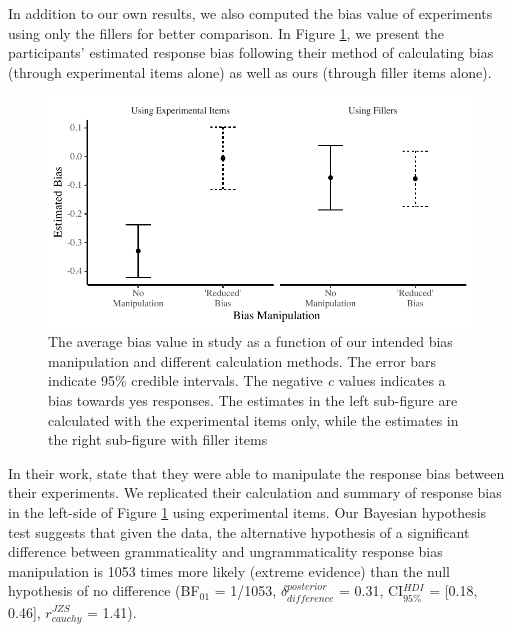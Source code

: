 In addition to our own results, we also computed the bias value of \cites{HammerlyEtAl2019} experiments using only the fillers for better comparison. In Figure \ref{fig:HammerlyBias}, we present the participants' estimated response bias following their method of calculating bias (through experimental items alone) as well as ours (through filler items alone). 


\begin{knitrout}
\color{fgcolor}\begin{figure}[hbt!]

{\centering \includegraphics[width=\linewidth]{figure/HammerlyBias-1} 

}

\caption{The average bias value in \cites{HammerlyEtAl2019} study as a function of our intended bias manipulation and different calculation methods. The error bars indicate 95\% credible intervals. The negative \emph{c} values indicates a bias towards yes responses. The estimates in the left sub-figure are calculated with the experimental items only, while the estimates in the right sub-figure with filler items}\label{fig:HammerlyBias}
\end{figure}

\end{knitrout}

In their work,  state that they were able to manipulate the response bias between their experiments. 
We replicated their calculation and summary of response bias in the left-side of Figure \ref{fig:HammerlyBias} using experimental items. 
Our Bayesian hypothesis test suggests that given the data, the alternative hypothesis of a significant difference between grammaticality and ungrammaticality response bias manipulation is 1053 times more likely (extreme evidence) than the null hypothesis of no difference (BF$_{01}$ = 1/1053, $\delta_{difference}^{posterior}$ = 0.31, CI$_{95\%}^{HDI}$ = [0.18, 0.46], $r_{cauchy}^{JZS}$ = 1.41).

